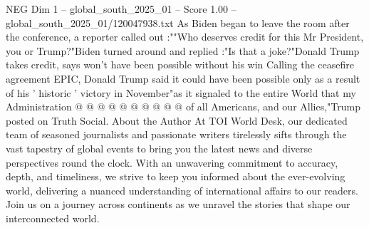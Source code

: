 \begin{textsample}{NEG Dim 1 – global\_south\_2025\_01 – Score 1.00 – global\_south\_2025\_01/120047938.txt}
As Biden began to leave the room after the conference, a reporter called out :""Who deserves credit for this Mr President, you or Trump?"Biden turned around and replied :"Is that a joke?"Donald Trump takes credit, says won't have been possible without his win Calling the ceasefire agreement EPIC, Donald Trump said it could have been possible only as a result of his ' historic ' victory in November"as it signaled to the entire World that my Administration @ @ @ @ @ @ @ @ @ @ of all Americans, and our Allies,"Trump posted on Truth Social.
About the Author At TOI World Desk, our dedicated team of seasoned journalists and passionate writers tirelessly sifts through the vast tapestry of global events to bring you the latest news and diverse perspectives round the clock.
With an unwavering commitment to accuracy, depth, and timeliness, we strive to keep you informed about the ever-evolving world, delivering a nuanced understanding of international affairs to our readers.
Join us on a journey across continents as we unravel the stories that shape our interconnected world.

\end{textsample}
